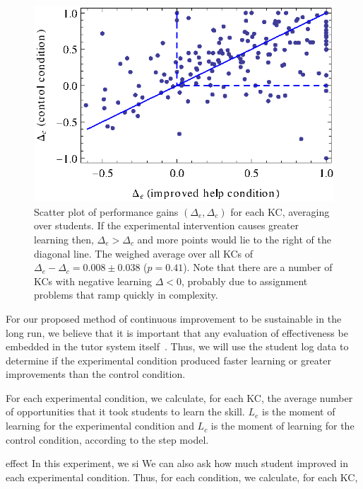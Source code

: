 \documentclass{edm_template}
\begin{document}
\begin{figure}
   \centering\includegraphics{scatter-gain.eps}
   \caption{Scatter plot of performance gains $\left(\Delta_e,\Delta_c\right)$
   for each KC, averaging over students.  If the experimental intervention
   causes greater learning then, $\Delta_e > \Delta_c$ and more points
   would lie to the right of the diagonal line.
   The weighed average over all KCs of $\Delta_e - \Delta_c = 
        0.008\pm 0.038$ ($p=0.41$).
   Note that there are a number
   of KCs with negative learning $\Delta<0$, probably due to 
   assignment problems that ramp quickly in complexity. 
   }\label{scattergain}
\end{figure}

For our proposed method of continuous improvement to be sustainable in
the long run, we believe that it is important that any evaluation of
effectiveness be embedded in the tutor system
itself~\cite{vanlehn_intelligent_2008}.  Thus, we will use the student
log data to determine if the experimental condition produced faster
learning or greater improvements than the control condition.

For each experimental condition, we calculate, for each KC, the
average number of opportunities that it took students to learn the
skill.  $L_e$ is the moment of learning for the experimental condition
and $L_c$ is the moment of learning for the control condition,
according to the step model.


effect 
In this experiment, we si
We can also ask how much student improved in each experimental condition.
Thus, for each condition, we calculate, for each KC, 
\end{document}
